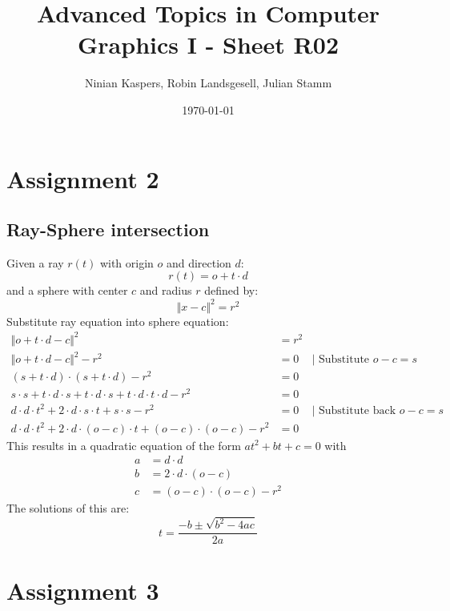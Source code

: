 \documentclass{article}
\title{Advanced Topics in Computer Graphics I - Sheet R02}
\author{Ninian Kaspers, Robin Landsgesell, Julian Stamm}
\date{\today}
\begin{document}
\maketitle

\section*{Assignment 2}

\subsection*{Ray-Sphere intersection}

Given a ray $r(t)$ with origin $o$ and direction $d$:
\begin{equation*}
  r(t) = o + t \cdot d  
\end{equation*}
and a sphere with center $c$ and radius $r$ defined by:
\begin{equation*}
  \Vert x - c \Vert^2 = r^2
\end{equation*}
Substitute ray equation into sphere equation:
\begin{align*}
  \Vert o + t \cdot d - c \Vert^2 &= r^2\\
  \Vert o + t \cdot d - c \Vert^2 - r^2 &= 0 &\vert\text{ Substitute }o-c=s\\
  (s + t \cdot d) \cdot (s + t \cdot d) - r^2 &= 0\\
  s \cdot s + t \cdot d \cdot s + t \cdot d \cdot s + t \cdot d \cdot t \cdot d - r^2 &= 0\\
  d \cdot d \cdot t^2 + 2 \cdot d \cdot s \cdot t + s \cdot s - r^2 &= 0 &\vert\text{ Substitute back }o-c=s\\
  d \cdot d \cdot t^2 + 2 \cdot d \cdot (o-c) \cdot t + (o-c) \cdot (o-c) - r^2 &= 0
\end{align*}
This results in a quadratic equation of the form $at^2 + bt + c = 0$ with
\begin{align*}
  a &= d \cdot d\\
  b &= 2 \cdot d \cdot (o-c)\\
  c &= (o-c) \cdot (o-c) - r^2
\end{align*}
The solutions of this are:
\begin{equation*}
  t = \frac{-b \pm \sqrt{b^2 - 4ac}}{2a}
\end{equation*}

\section*{Assignment 3}
\end{document}
